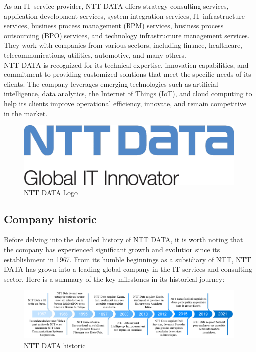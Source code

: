 \documentclass[12pt,a4paper,table,english]{article}
\begin{document}
	As an IT service provider, NTT DATA offers strategy consulting services, application development services, system integration services, IT infrastructure services, business process management (BPM) services, business process outsourcing (BPO) services, and technology infrastructure management services. They work with companies from various sectors, including finance, healthcare, telecommunications, utilities, automotive, and many others.\\
	
	NTT DATA is recognized for its technical expertise, innovation capabilities, and commitment to providing customized solutions that meet the specific needs of its clients. The company leverages emerging technologies such as artificial intelligence, data analytics, the Internet of Things (IoT), and cloud computing to help its clients improve operational efficiency, innovate, and remain competitive in the market.
	
	\begin{figure}[h!]
		\centering
		\includegraphics[width=0.8\linewidth]{Image/nttgloballogo.png}
		\caption{NTT DATA Logo}
		\label{fig:NTT DATA Logo}
	\end{figure}
	\pagebreak
	
	\subsection{Company historic}
	
	Before delving into the detailed history of NTT DATA, it is worth noting that the company has experienced significant growth and evolution since its establishment in 1967. From its humble beginnings as a subsidiary of NTT, NTT DATA has grown into a leading global company in the IT services and consulting sector. Here is a summary of the key milestones in its historical journey:
	
	\begin{figure}[h!]
		\centering
		\includegraphics[width=0.8\linewidth]{Image/ntthistoric.png}
		\caption{NTT DATA historic}
		\label{fig:NTT DATA historic}
	\end{figure}
	
\end{document}
